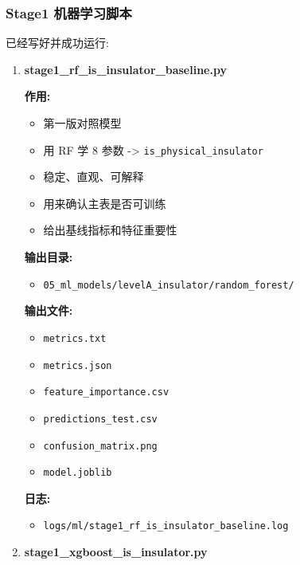\documentclass[lang=cn,scheme=chinese,color=blue,device=normal,toc=onecol,math=cm]{elegantbook}
\begin{document}
\subsubsection{Stage1 机器学习脚本}


已经写好并成功运行:\par


\begin{enumerate}
\item \textbf{stage1\_\allowbreak{}rf\_\allowbreak{}is\_\allowbreak{}insulator\_\allowbreak{}baseline.py}\par
 
\textbf{作用:}\par
 
\begin{itemize}
\item 第一版对照模型
\item 用 RF 学 8 参数 -> \texttt{is\_\allowbreak{}physical\_\allowbreak{}insulator}
\item 稳定、直观、可解释
\item 用来确认主表是否可训练
\item 给出基线指标和特征重要性
\end{itemize}
 
\textbf{输出目录:}\par
 
\begin{itemize}
\item \texttt{05\_\allowbreak{}ml\_\allowbreak{}models/\allowbreak{}levelA\_\allowbreak{}insulator/\allowbreak{}random\_\allowbreak{}forest/\allowbreak{}}
\end{itemize}
 
\textbf{输出文件:}\par
 
\begin{itemize}
\item \texttt{metrics.txt}
\item \texttt{metrics.json}
\item \texttt{feature\_\allowbreak{}importance.csv}
\item \texttt{predictions\_\allowbreak{}test.csv}
\item \texttt{confusion\_\allowbreak{}matrix.png}
\item \texttt{model.joblib}
\end{itemize}
 
\textbf{日志:}\par
 
\begin{itemize}
\item \texttt{logs/\allowbreak{}ml/\allowbreak{}stage1\_\allowbreak{}rf\_\allowbreak{}is\_\allowbreak{}insulator\_\allowbreak{}baseline.log}
\end{itemize}
\item \textbf{stage1\_\allowbreak{}xgboost\_\allowbreak{}is\_\allowbreak{}insulator.py}\par
 

\end{enumerate}
\end{document}
